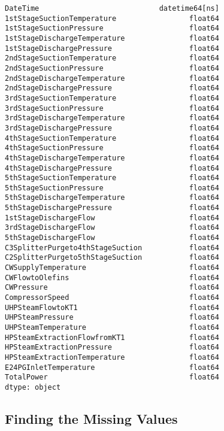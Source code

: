 \documentclass[11pt]{article}
\makeatletter
\newcommand{\boxspacing}{\kern\kvtcb@left@rule\kern\kvtcb@boxsep}
\newcommand{\prompt}[4]{
        \ttfamily\llap{{\color{#2}[#3]:\hspace{3pt}#4}}\vspace{-\baselineskip}
    }
\makeatother
\begin{document}
            \begin{tcolorbox}[breakable, size=fbox, boxrule=.5pt, pad at break*=1mm, opacityfill=0]
\prompt{Out}{outcolor}{20}{\boxspacing}
\begin{Verbatim}[commandchars=\\\{\}]
DateTime                            datetime64[ns]
1stStageSuctionTemperature                 float64
1stStageSuctionPressure                    float64
1stStageDischargeTemperature               float64
1stStageDischargePressure                  float64
2ndStageSuctionTemperature                 float64
2ndStageSuctionPressure                    float64
2ndStageDischargeTemperature               float64
2ndStageDischargePressure                  float64
3rdStageSuctionTemperature                 float64
3rdStageSuctionPressure                    float64
3rdStageDischargeTemperature               float64
3rdStageDischargePressure                  float64
4thStageSuctionTemperature                 float64
4thStageSuctionPressure                    float64
4thStageDischargeTemperature               float64
4thStageDischargePressure                  float64
5thStageSuctionTemperature                 float64
5thStageSuctionPressure                    float64
5thStageDischargeTemperature               float64
5thStageDischargePressure                  float64
1stStageDischargeFlow                      float64
3rdStageDischargeFlow                      float64
5thStageDischargeFlow                      float64
C3SplitterPurgeto4thStageSuction           float64
C2SplitterPurgeto5thStageSuction           float64
CWSupplyTemperature                        float64
CWFlowtoOlefins                            float64
CWPressure                                 float64
CompressorSpeed                            float64
UHPSteamFlowtoKT1                          float64
UHPSteamPressure                           float64
UHPSteamTemperature                        float64
HPSteamExtractionFlowfromKT1               float64
HPSteamExtractionPressure                  float64
HPSteamExtractionTemperature               float64
E24PGInletTemperature                      float64
TotalPower                                 float64
dtype: object
\end{Verbatim}
\end{tcolorbox}
        
    \hypertarget{finding-the-missing-values}{%
\subsection{Finding the Missing
Values}\label{finding-the-missing-values}}
\end{document}
